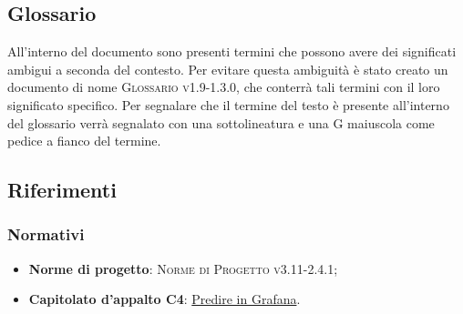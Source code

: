 \documentclass[../piano-di-qualifica.tex]{subfiles}
\begin{document}
\subsection{Glossario}%
\label{sub:glossario}
All'interno del documento sono presenti termini che possono avere dei significati ambigui a seconda del contesto. Per evitare questa ambiguità è stato creato un documento di nome \textsc{Glossario v1.9-1.3.0}, che conterrà tali termini con il loro significato specifico. Per segnalare che il termine del testo è presente all'interno del glossario verrà segnalato con una sottolineatura e una G maiuscola come pedice a fianco del termine.

\subsection{Riferimenti}%
\label{sub:riferimenti}

\subsubsection{Normativi}%
\label{subs:normativi}
\begin{itemize}
    \item \textbf{Norme di progetto}: \textsc{Norme di Progetto v3.11-2.4.1};
    \item \textbf{Capitolato d'appalto C4}: \href{https://www.math.unipd.it/~tullio/IS-1/2019/Progetto/C4.pdf}{Predire in Grafana}.
\end{itemize}
\end{document}
